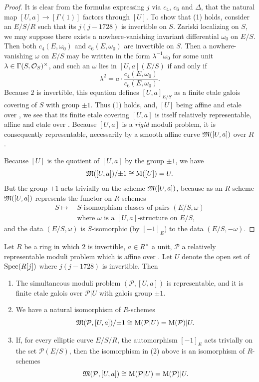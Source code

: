 \begin{proof}
It is clear from the formulas expressing $j$ via $c_4$, $c_6$ and $\Delta$, that the natural map $[U, a] \to [\Gamma(1)]$ factors through $[U]$. To show that (1) holds, consider an $E/S/R$ such that its $j(j-1728)$ is invertible on $S$. Zariski localizing on $S$, we may suppose there exists a nowhere-vanishing invariant differential $\omega_0$ on $E/S$. Then both $c_4(E, \omega_0)$ and $c_6(E, \omega_0)$ are invertible on $S$. Then a nowhere-vanishing $\omega$ on $E/S$ may be written in the form $\lambda^{-1}\omega_0$ for some unit $\lambda \in \Gamma(S, \mathcal{O}_S)^\times$, and such an $\omega$ lies in $[U, a](E/S)$ if and only if
\[
\lambda^2 = a \cdot \frac{c_4(E, \omega_0)}{c_6(E, \omega_0)} .
\]
Because $2$ is invertible, this equation defines $[U, a]_{E/S}$ as a finite etale galois covering of $S$ with group $\pm 1$. Thus (1) holds, and, $[U]$ being affine and etale over \EllR, we see that its finite etale covering $[U, a]$ is itself relatively representable, affine and etale over \EllR. Because $[U, a]$ is a \emph{rigid} moduli problem, it is consequently representable, necessarily by a smooth affine curve $\mathfrak{M}([U, a])$ over $R$.

Because $[U]$ is the quotient of $[U, a]$ by the group $\pm 1$, we have
\[
\mathfrak{M}([U, a])/{\pm 1} \cong \mathrm{M}([U]) = U .
\]
But the group $\pm 1$ acts trivially on the scheme $\mathfrak{M}([U, a])$, because as an $R$-scheme $\mathfrak{M}([U, a])$ represents the functor on $R$-schemes
\[
\begin{aligned}
S \mapsto\ &\text{$S$-isomorphism classes of pairs } (E/S, \omega) \\
&\text{where $\omega$ is a $[U, a]$-structure on } E/S ,
\end{aligned}
\]
and the data $(E/S, \omega)$ is $S$-isomorphic (by $[-1]_E$) to the data $(E/S, -\omega)$.
\end{proof}

\begin{kcor}\label{cor:8.4.10}
Let $R$ be a ring in which $2$ is invertible, $a \in R^\times$ a unit, $\mathcal{P}$ a relatively representable moduli problem which is affine over \EllR. Let $U$ denote the open set of $\operatorname{Spec}(R[j])$ where $j(j-1728)$ is invertible. Then
\begin{enumerate}[(1)]
\item The simultaneous moduli problem $(\mathcal{P}, [U, a])$ is representable, and it is finite etale galois over $\mathcal{P}|U$ with galois group $\pm 1$.
\item We have a natural isomorphism of $R$-schemes
\[
\mathfrak{M}(\mathcal{P}, [U, a])/{\pm 1} \cong \mathrm{M}(\mathcal{P}|U) = \mathrm{M}(\mathcal{P})|U .
\]
\item If, for every elliptic curve $E/S/R$, the automorphism $[-1]_E$ acts trivially on the set $\mathcal{P}(E/S)$, then the isomorphism in (2) above is an isomorphism of $R$-schemes
\[
\mathfrak{M}(\mathcal{P}, [U, a]) \cong \mathrm{M}(\mathcal{P}|U) = \mathrm{M}(\mathcal{P})|U .
\]
\end{enumerate}
\end{kcor}

